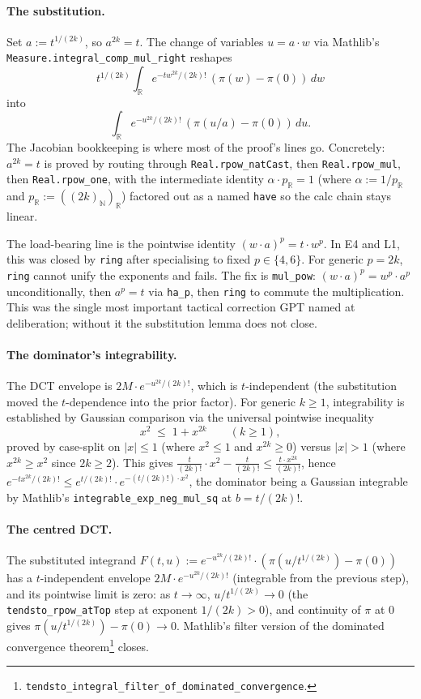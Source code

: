 \documentclass[11pt]{article}
\begin{document}
\paragraph{The substitution.} Set $a := t^{1/(2k)}$, so $a^{2k} = t$.
The change of variables $u = a\cdot w$ via Mathlib's
\texttt{Measure.integral\_comp\_mul\_right} reshapes
\[
  t^{1/(2k)} \int_{\mathbb R} e^{-t w^{2k}/(2k)!}\,(\pi(w) - \pi(0))\,dw
\]
into
\[
  \int_{\mathbb R} e^{-u^{2k}/(2k)!}\,(\pi(u/a) - \pi(0))\,du.
\]
The Jacobian bookkeeping is where most of the proof's lines go.
Concretely: $a^{2k} = t$ is proved by routing through
\texttt{Real.rpow\_natCast}, then \texttt{Real.rpow\_mul}, then
\texttt{Real.rpow\_one}, with the intermediate identity
$\alpha \cdot p_{\mathbb R} = 1$ (where $\alpha := 1/p_{\mathbb R}$
and $p_{\mathbb R} := ((2k)_{\mathbb N})_{\mathbb R}$) factored out
as a named \texttt{have} so the calc chain stays linear.

The load-bearing line is the pointwise identity
$(w \cdot a)^{p} = t \cdot w^{p}$. In E4 and L1, this was closed by
\texttt{ring} after specialising to fixed $p \in \{4, 6\}$. For
generic $p = 2k$, \texttt{ring} cannot unify the exponents and
fails. The fix is \texttt{mul\_pow}: $(w\cdot a)^p = w^p \cdot a^p$
unconditionally, then $a^p = t$ via \texttt{ha\_p}, then
\texttt{ring} to commute the multiplication. This was the single
most important tactical correction GPT named at deliberation; without
it the substitution lemma does not close.

\paragraph{The dominator's integrability.} The DCT envelope is
$2M \cdot e^{-u^{2k}/(2k)!}$, which is $t$-independent (the
substitution moved the $t$-dependence into the prior factor). For
generic $k \ge 1$, integrability is established by Gaussian
comparison via the universal pointwise inequality
\[
  x^2 \;\le\; 1 + x^{2k} \qquad (k \ge 1),
\]
proved by case-split on $|x| \le 1$ (where $x^2 \le 1$ and
$x^{2k} \ge 0$) versus $|x| > 1$ (where $x^{2k} \ge x^2$ since
$2k \ge 2$). This gives
$\tfrac{t}{(2k)!} \cdot x^2 - \tfrac{t}{(2k)!} \le \tfrac{t \cdot x^{2k}}{(2k)!}$,
hence $e^{-tx^{2k}/(2k)!} \le e^{t/(2k)!}\cdot e^{-(t/(2k)!) \cdot x^2}$,
the dominator being a Gaussian integrable by Mathlib's
\texttt{integrable\_exp\_neg\_mul\_sq} at $b = t/(2k)!$.

\paragraph{The centred DCT.} The substituted integrand
$F(t,u) := e^{-u^{2k}/(2k)!}\cdot (\pi(u/t^{1/(2k)}) - \pi(0))$ has a
$t$-independent envelope $2M\cdot e^{-u^{2k}/(2k)!}$ (integrable from
the previous step), and its pointwise limit is zero: as $t \to \infty$,
$u/t^{1/(2k)} \to 0$ (the
\texttt{tendsto\_rpow\_atTop} step at exponent $1/(2k) > 0$), and
continuity of $\pi$ at $0$ gives
$\pi(u/t^{1/(2k)}) - \pi(0) \to 0$. Mathlib's filter version of the
dominated convergence theorem\footnote{%
\texttt{tendsto\_integral\_filter\_of\_dominated\_convergence}.}
closes.
\end{document}
